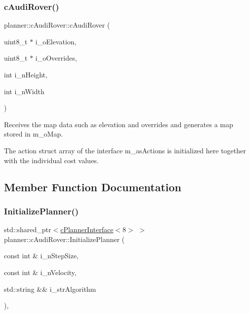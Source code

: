 \subsubsection{\texorpdfstring{c\+Audi\+Rover()}{cAudiRover()}\hspace{0.1cm}{\footnotesize\ttfamily [2/2]}}
{\footnotesize\ttfamily planner\+::c\+Audi\+Rover\+::c\+Audi\+Rover (\begin{DoxyParamCaption}\item[{uint8\+\_\+t $\ast$}]{i\+\_\+o\+Elevation,  }\item[{uint8\+\_\+t $\ast$}]{i\+\_\+o\+Overrides,  }\item[{int}]{i\+\_\+n\+Height,  }\item[{int}]{i\+\_\+n\+Width }\end{DoxyParamCaption})}



Receives the map data such as elevation and overrides and generates a map stored in m\+\_\+o\+Map. 

The action struct array of the interface m\+\_\+as\+Actions is initialized here together with the individual cost values. 

\subsection{Member Function Documentation}
\mbox{\label{classplanner_1_1c_audi_rover_afc214acc6e76a6820501971769bc270f}} 
\subsubsection{\texorpdfstring{Initialize\+Planner()}{InitializePlanner()}}
{\footnotesize\ttfamily std\+::shared\+\_\+ptr$<$\mbox{\hyperlink{classplanner_1_1c_planner_interface}{c\+Planner\+Interface}}$<$8$>$ $>$ planner\+::c\+Audi\+Rover\+::\+Initialize\+Planner (\begin{DoxyParamCaption}\item[{const int \&}]{i\+\_\+n\+Step\+Size,  }\item[{const int \&}]{i\+\_\+n\+Velocity,  }\item[{std\+::string \&\&}]{i\+\_\+str\+Algorithm }\end{DoxyParamCaption})\hspace{0.3cm}{\ttfamily [override]}, {\ttfamily [virtual]}}



